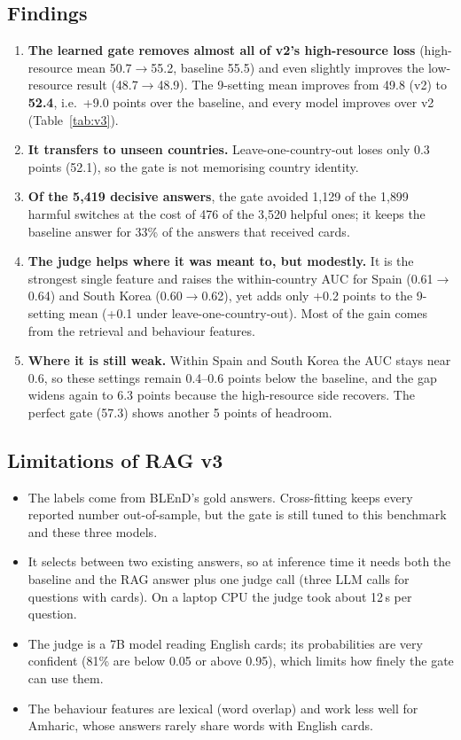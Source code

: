 \documentclass[11pt]{article}
\begin{document}
\subsection{Findings}
\begin{enumerate}
\item \textbf{The learned gate removes almost all of v2's high-resource loss} (high-resource mean
50.7$\rightarrow$55.2, baseline 55.5) and even slightly improves the low-resource result
(48.7$\rightarrow$48.9). The 9-setting mean improves from 49.8 (v2) to \textbf{52.4}, i.e.\ +9.0 points
over the baseline, and every model improves over v2 (Table~\ref{tab:v3}).
\item \textbf{It transfers to unseen countries.} Leave-one-country-out loses only 0.3 points (52.1),
so the gate is not memorising country identity.
\item \textbf{Of the 5{,}419 decisive answers}, the gate avoided 1{,}129 of the 1{,}899 harmful
switches at the cost of 476 of the 3{,}520 helpful ones; it keeps the baseline answer for 33\% of the
answers that received cards.
\item \textbf{The judge helps where it was meant to, but modestly.} It is the strongest single feature
and raises the within-country AUC for Spain (0.61$\rightarrow$0.64) and South Korea
(0.60$\rightarrow$0.62), yet adds only +0.2 points to the 9-setting mean (+0.1 under
leave-one-country-out). Most of the gain comes from the retrieval and behaviour features.
\item \textbf{Where it is still weak.} Within Spain and South Korea the AUC stays near 0.6, so these
settings remain 0.4--0.6 points below the baseline, and the gap widens again to 6.3 points because the
high-resource side recovers. The perfect gate (57.3) shows another 5 points of headroom.
\end{enumerate}

\subsection{Limitations of RAG v3}
\begin{itemize}
\item The labels come from BLEnD's gold answers. Cross-fitting keeps every reported number
out-of-sample, but the gate is still tuned to this benchmark and these three models.
\item It selects between two existing answers, so at inference time it needs both the baseline and the
RAG answer plus one judge call (three LLM calls for questions with cards). On a laptop CPU the judge took
about 12\,s per question.
\item The judge is a 7B model reading English cards; its probabilities are very confident (81\% are below 0.05 or
above 0.95), which limits how finely the gate can use them.
\item The behaviour features are lexical (word overlap) and work less well for Amharic, whose answers
rarely share words with English cards.
\end{itemize}
\end{document}

